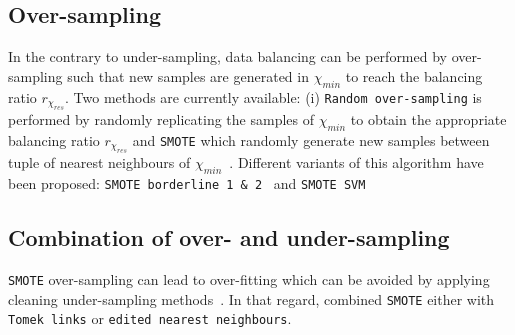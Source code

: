 \documentclass[twoside,11pt]{article}
\begin{document}

\subsection{Over-sampling}

In the contrary to under-sampling, data balancing can be performed by over-sampling such that new samples are generated in $\chi_{min}$ to reach the balancing ratio $r_{\chi_{res}}$.
Two methods are currently available: (i) \texttt{Random over-sampling} is performed by randomly replicating the samples of $\chi_{min}$ to obtain the appropriate balancing ratio $r_{\chi_{res}}$ and \texttt{SMOTE} which randomly generate new samples between tuple of nearest neighbours of $\chi_{min}$~\citep{chawla2002smote}.
Different variants of this algorithm have been proposed: \texttt{SMOTE borderline 1 \& 2}~\citep{han2005borderline} and \texttt{SMOTE SVM}~\citep{nguyen2011borderline}



\subsection{Combination of over- and under-sampling}

\texttt{SMOTE} over-sampling can lead to over-fitting which can be avoided by applying cleaning under-sampling methods~\citep{prati2009data}.
In that regard, \cite{batista2003balancing} combined \texttt{SMOTE} either with \texttt{Tomek links} or \texttt{edited nearest neighbours}.
\end{document}
